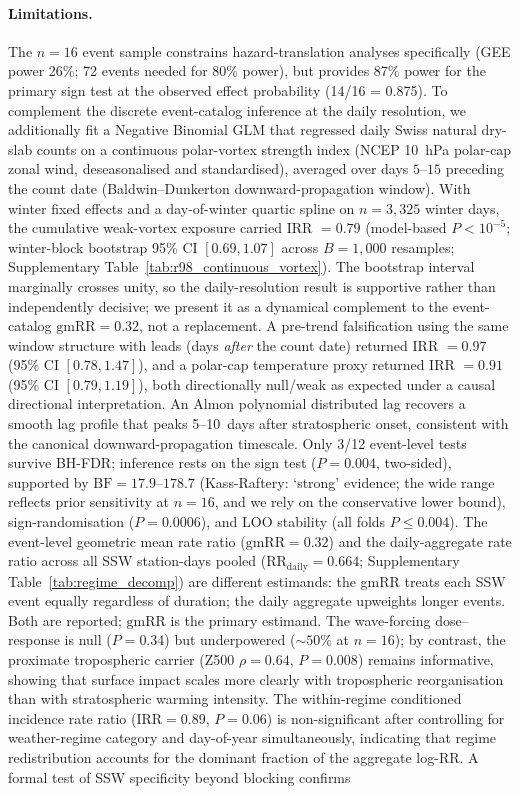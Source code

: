 \documentclass[11pt,letterpaper]{article}
\begin{document}
\paragraph{Limitations.} The $n = 16$ event sample constrains hazard-translation analyses specifically (GEE power 26\%; 72 events needed for 80\% power), but provides 87\% power for the primary sign test at the observed effect probability (14/16 = 0.875). To complement the discrete event-catalog inference at the daily resolution, we additionally fit a Negative Binomial GLM that regressed daily Swiss natural dry-slab counts on a continuous polar-vortex strength index (NCEP 10~hPa polar-cap zonal wind, deseasonalised and standardised), averaged over days $5$--$15$ preceding the count date (Baldwin--Dunkerton downward-propagation window). With winter fixed effects and a day-of-winter quartic spline on $n = 3{,}325$ winter days, the cumulative weak-vortex exposure carried IRR $= 0.79$ (model-based $P < 10^{-5}$; winter-block bootstrap 95\% CI $[0.69, 1.07]$ across $B = 1{,}000$ resamples; Supplementary Table~\ref{tab:r98_continuous_vortex}). The bootstrap interval marginally crosses unity, so the daily-resolution result is supportive rather than independently decisive; we present it as a dynamical complement to the event-catalog $\mathrm{gmRR} = 0.32$, not a replacement. A pre-trend falsification using the same window structure with leads (days \emph{after} the count date) returned IRR $= 0.97$ (95\% CI $[0.78, 1.47]$), and a polar-cap temperature proxy returned IRR $= 0.91$ (95\% CI $[0.79, 1.19]$), both directionally null/weak as expected under a causal directional interpretation. An Almon polynomial distributed lag recovers a smooth lag profile that peaks 5--10~days after stratospheric onset, consistent with the canonical downward-propagation timescale. Only 3/12 event-level tests survive BH-FDR; inference rests on the sign test ($P = 0.004$, two-sided), supported by $\mathrm{BF} = 17.9$--$178.7$ (Kass-Raftery: `strong' evidence; the wide range reflects prior sensitivity at $n = 16$, and we rely on the conservative lower bound), sign-randomisation ($P = 0.0006$), and LOO stability (all folds $P \leq 0.004$). The event-level geometric mean rate ratio ($\mathrm{gmRR} = 0.32$) and the daily-aggregate rate ratio across all SSW station-days pooled ($\mathrm{RR}_{\mathrm{daily}} = 0.664$; Supplementary Table~\ref{tab:regime_decomp}) are different estimands: the gmRR treats each SSW event equally regardless of duration; the daily aggregate upweights longer events. Both are reported; $\mathrm{gmRR}$ is the primary estimand. The wave-forcing dose--response is null ($P = 0.34$) but underpowered (${\sim}50\%$ at $n = 16$); by contrast, the proximate tropospheric carrier (Z500 $\rho = 0.64$, $P = 0.008$) remains informative, showing that surface impact scales more clearly with tropospheric reorganisation than with stratospheric warming intensity. The within-regime conditioned incidence rate ratio ($\mathrm{IRR} = 0.89$, $P = 0.06$) is non-significant after controlling for weather-regime category and day-of-year simultaneously, indicating that regime redistribution accounts for the dominant fraction of the aggregate log-RR. A formal test of SSW specificity beyond blocking confirms 
\end{document}
